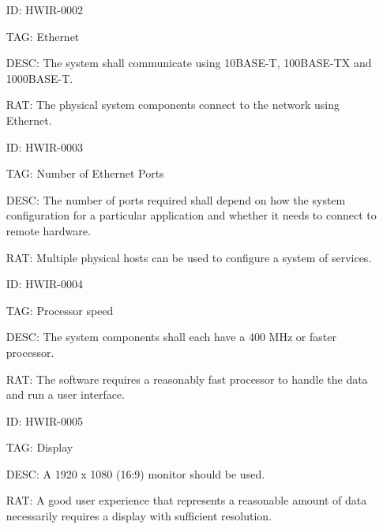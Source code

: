         \begin{itemize}
          \setlength{\itemindent}{.5in}
          \itemsep .15em
          \item[ID:] HWIR-0002
          \item[TAG:] Ethernet
          \item[DESC:] The system shall communicate using 10BASE-T,
            100BASE-TX and 1000BASE-T.
          \item[RAT:] The physical system components connect to the network
            using Ethernet.
        \end{itemize}

        \begin{itemize}
          \setlength{\itemindent}{.5in}
          \itemsep .15em
          \item[ID:] HWIR-0003
          \item[TAG:] Number of Ethernet Ports
          \item[DESC:] The number of ports required shall depend on how the
            system configuration for a particular application and whether it
            needs to connect to remote hardware.
          \item[RAT:] Multiple physical hosts can be used to configure a
            system of services.
        \end{itemize}

        \begin{itemize}
          \setlength{\itemindent}{.5in}
          \itemsep .15em
          \item[ID:] HWIR-0004
          \item[TAG:] Processor speed
          \item[DESC:] The system components shall each have a 400 MHz or
            faster processor.
          \item[RAT:] The software requires a reasonably fast processor to
            handle the data and run a user interface.
        \end{itemize}

        \begin{itemize}
          \setlength{\itemindent}{.5in}
          \itemsep .15em
          \item[ID:] HWIR-0005
          \item[TAG:] Display
          \item[DESC:] A 1920 x 1080 (16:9) monitor should be used.
          \item[RAT:] A good user experience that represents a reasonable
            amount of data necessarily requires a display with sufficient
            resolution.
        \end{itemize}

